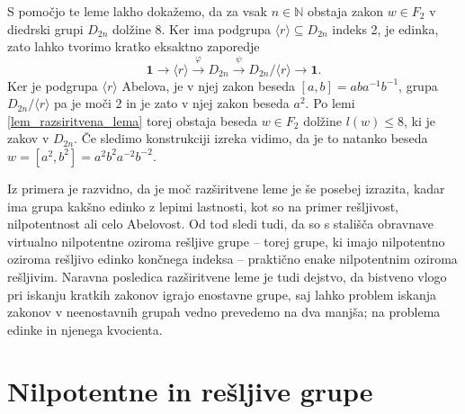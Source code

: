 \documentclass[mat1, tisk]{fmfdelo}
\numberwithin{equation}{section}  %
\begin{document}
\begin{primer}
    S pomočjo te leme lakho dokažemo, da za vsak $n \in \mathbb{N}$ obstaja zakon $w \in F_2$ v diedrski grupi $D_{2n}$ dolžine $8$. Ker ima podgrupa $\langle r \rangle \subseteq D_{2n}$ indeks 2, je edinka,
    zato lahko tvorimo kratko eksaktno zaporedje \begin{equation*}
        \mathbf{1} \to \langle r \rangle  \xrightarrow{\varphi} D_{2n} \xrightarrow{\psi} D_{2n} / \langle r \rangle  \to \mathbf{1}.
        \end{equation*}
        Ker je podgrupa $\langle r \rangle$ Abelova, je v njej zakon beseda $[a, b] = aba^{-1} b^{-1}$, grupa $D_{2n} / \langle r \rangle$ pa je moči $2$ in je zato v njej zakon beseda $a^2$. Po lemi \ref{lem_razsiritvena_lema} torej obstaja beseda $w \in F_2$ dolžine $l(w) \le  8$, ki je zakov v $D_{2n}$.
        Če sledimo konstrukciji izreka vidimo, da je to natanko beseda $w = [a^2, b^2] = a^2 b^2 a^{-2} b^{-2}$.   
\end{primer}

Iz primera je razvidno, da je moč razširitvene leme je še posebej izrazita, kadar ima grupa kakšno edinko z lepimi lastnosti, kot so na primer rešljivost, nilpotentnost ali celo Abelovost. Od tod sledi tudi, da so s stališča obravnave virtualno nilpotentne oziroma rešljive grupe -- torej grupe, ki imajo nilpotentno oziroma rešljivo edinko končnega indeksa --
praktično enake nilpotentnim oziroma rešljivim. Naravna posledica razširitvene leme je tudi dejstvo, da bistveno vlogo pri iskanju kratkih zakonov igrajo enostavne grupe, saj lahko problem iskanja zakonov v neenostavnih grupah vedno prevedemo na dva manjša; na problema edinke in njenega kvocienta.  

\section{Nilpotentne in rešljive grupe}


\end{document}
